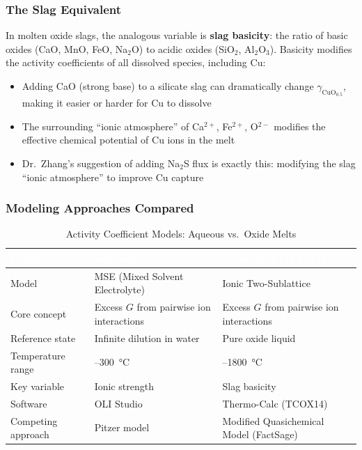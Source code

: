 \documentclass[11pt]{article}
\begin{document}
\subsubsection{The Slag Equivalent}

In molten oxide slags, the analogous variable is \textbf{slag basicity}: the ratio of basic oxides (CaO, MnO, FeO, Na$_2$O) to acidic oxides (SiO$_2$, Al$_2$O$_3$). Basicity modifies the activity coefficients of all dissolved species, including Cu:

\begin{itemize}[leftmargin=*]
    \item Adding CaO (strong base) to a silicate slag can dramatically change $\gamma_{\text{CuO}_{0.5}}$, making it easier or harder for Cu to dissolve
    \item The surrounding ``ionic atmosphere'' of Ca$^{2+}$, Fe$^{2+}$, O$^{2-}$ modifies the effective chemical potential of Cu ions in the melt
    \item Dr.\ Zhang's suggestion of adding Na$_2$S flux is exactly this: modifying the slag ``ionic atmosphere'' to improve Cu capture
\end{itemize}

\subsubsection{Modeling Approaches Compared}

\begin{table}[H]
\caption{Activity Coefficient Models: Aqueous vs.\ Oxide Melts}
\label{tab:models_compared}
\centering
\renewcommand{\arraystretch}{1.3}
\begin{tabular}{|>{\raggedright\arraybackslash}p{1.6in}|>{\raggedright\arraybackslash}p{2.1in}|>{\raggedright\arraybackslash}p{2.1in}|}
\hline
\rowcolor{headercolor}
\textcolor{white}{\textbf{Feature}} & \textcolor{white}{\textbf{Aqueous (OLI)}} & \textcolor{white}{\textbf{Oxide Slag (TCOX14)}} \\
\hline
Model & MSE (Mixed Solvent Electrolyte) & Ionic Two-Sublattice \\
\hline
\rowcolor{altrow}
Core concept & Excess $G$ from pairwise ion interactions & Excess $G$ from pairwise ion interactions \\
\hline
Reference state & Infinite dilution in water & Pure oxide liquid \\
\hline
\rowcolor{altrow}
Temperature range & 25--\SI{300}{\celsius} & 1200--\SI{1800}{\celsius} \\
\hline
Key variable & Ionic strength & Slag basicity \\
\hline
\rowcolor{altrow}
Software & OLI Studio & Thermo-Calc (TCOX14) \\
\hline
Competing approach & Pitzer model & Modified Quasichemical Model (FactSage) \\
\hline
\end{tabular}
\end{table}
\end{document}
